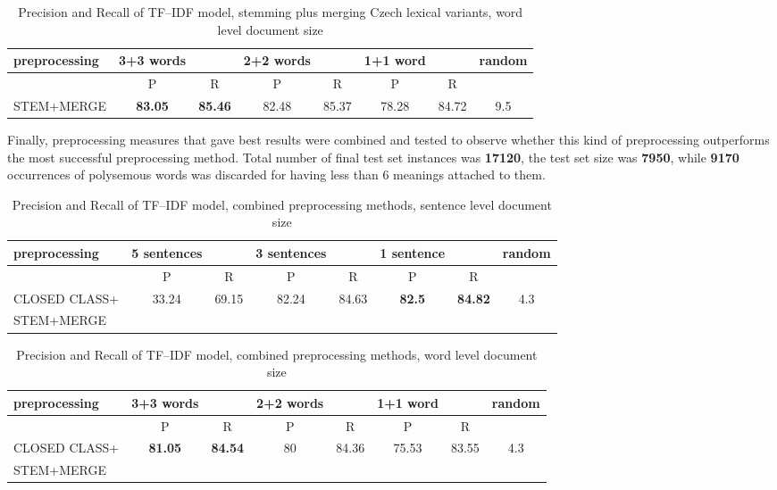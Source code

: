 \begin{table}[h!]
\begin{tabular}{ l | c c | c c | c c | c}
   preprocessing &  3+3 words && 2+2 words && 1+1 word  && random\\
\hline\hline
	& P  &  R & P  &  R & P  &  R &\\
\hline
STEM+MERGE & \textbf{ 83.05}  & \textbf{85.46}  & 82.48 &  85.37 & 78.28  &  84.72 & 9.5\\
\end{tabular}
\caption{Precision and Recall of TF--IDF model, stemming plus merging Czech lexical variants, word level document size}
\end{table}

Finally, preprocessing measures that gave best results were combined and tested to observe whether
this kind of preprocessing outperforms the most successful preprocessing method. Total number of final test set instances was  \textbf{17120}, the test set size was \textbf{7950}, while \textbf{9170} occurrences of polysemous words was discarded for having less than 6 meanings attached to them.

\begin{table}[h!]
\begin{tabular}{ l | c c | c c | c c | c}
   preprocessing &  5 sentences && 3 sentences && 1 sentence  && random\\
\hline
	& P  &  R & P  &  R & P  &  R &\\
\hline\hline
CLOSED CLASS+ & 33.24  & 69.15  & 82.24  & 84.63 & \textbf{82.5} & \textbf{84.82} & 4.3  \\
STEM+MERGE &&&&&&&\\
\end{tabular}
\caption{Precision and Recall of TF--IDF model, combined preprocessing methods, sentence level document size}
\end{table}

\begin{table}[h!]
\begin{tabular}{ l | c c | c c | c c | c}
   preprocessing &  3+3 words && 2+2 words && 1+1 word  && random\\
\hline\hline
	& P  &  R & P  &  R & P  &  R &\\
\hline
CLOSED CLASS+ & \textbf{81.05}  & \textbf{84.54}  & 80  & 84.36  & 75.53 & 83.55  & 4.3\\
STEM+MERGE &&&&&&&\\
\end{tabular}
\caption{Precision and Recall of TF--IDF model,  combined preprocessing methods, word level document size}
\end{table} 

